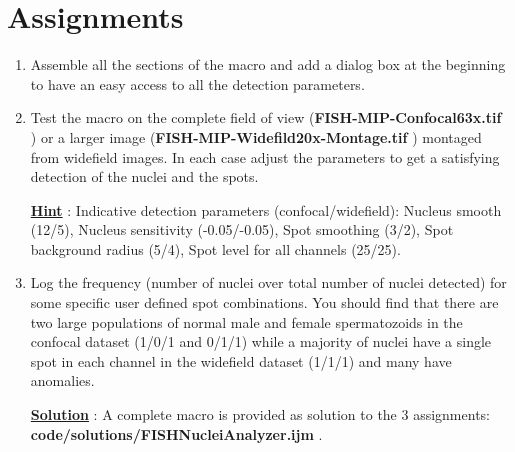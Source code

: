 \section{Assignments}

\begin{enumerate}
\item Assemble all the sections of the macro and add a dialog box at the beginning to have an easy access to all the detection parameters.
 
\item Test the macro on the complete field of view (\textbf{FISH-MIP-Confocal63x.tif} ) or a larger image (\textbf{FISH-MIP-Widefild20x-Montage.tif} ) montaged from widefield images. In each case adjust the parameters to get a satisfying detection of the nuclei and the spots.

\textbf{\underline{Hint}} : Indicative detection parameters (confocal/widefield): Nucleus smooth (12/5), Nucleus sensitivity (-0.05/-0.05), Spot smoothing (3/2), Spot background radius (5/4), Spot level for all channels (25/25).

\item Log the frequency (number of nuclei over total number of nuclei detected) for some specific user defined spot combinations. You should find that there are two large populations of normal male and female spermatozoids in the confocal dataset (1/0/1 and 0/1/1) while a majority of nuclei have a single spot in each channel in the widefield dataset (1/1/1) and many have anomalies.

\textbf{\underline{Solution}} : A complete macro is provided as solution to the 3 assignments: \textbf{code/solutions/FISHNucleiAnalyzer.ijm} .

\end{enumerate}